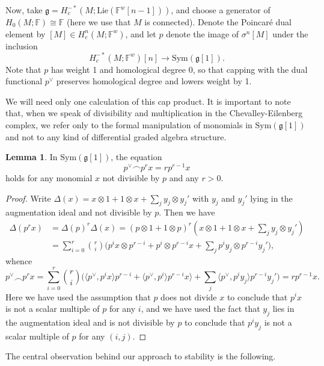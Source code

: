\documentclass{compositio}
\theoremstyle{definition}\newtheorem{definition}{Definition}[section]
\theoremstyle{theorem}\newtheorem{lemma}[definition]{Lemma}
\theoremstyle{remark}\newtheorem*{conventions}{Conventions}
\theoremstyle{remark}\newtheorem*{acknowledgments}{Acknowledgments}
\theoremstyle{remark}\newtheorem*{outline}{Outline}
\theoremstyle{remark}\newtheorem*{questions}{Questions}
\theoremstyle{remark}\newtheorem{example}[definition]{Example}
\theoremstyle{definition}\newtheorem{construction}[definition]{Construction}
\theoremstyle{definition}\newtheorem*{convention}{Convention}
\theoremstyle{definition}\newtheorem*{conjecture}{Conjecture}
\theoremstyle{theorem}\newtheorem{theorem}[definition]{Theorem}
\theoremstyle{theorem}\newtheorem{paradigm}[definition]{Paradigm}
\theoremstyle{remark}\newtheorem{remark}[definition]{Remark}
\theoremstyle{corollary}\newtheorem{corollary}[definition]{Corollary}
\theoremstyle{theorem}\newtheorem{proposition}[definition]{Proposition}
\theoremstyle{definition}\newtheorem{question}[definition]{Question}
\begin{document}
Now, take $\mathfrak{g}=H_c^{-*}(M;{\mathrm{Lie}}(\mathbb{F}^w[n-1]))$, and choose a generator of $H_0(M;\mathbb{F})\cong\mathbb{F}$ (here we use that $M$ is connected). Denote the Poincar\'{e} dual element by $[M]\in H_c^{n}(M;\mathbb{F}^w)$, and let $p$ denote the image of $\sigma^n[M]$ under the inclusion $$H_c^{-*}(M;\mathbb{F}^w)[n]\to {\mathrm{Sym}}(\mathfrak{g}[1]).$$ Note that $p$ has weight 1 and homological degree 0, so that capping with the dual functional $p^\vee$ preserves homological degree and lowers weight by 1. 

We will need only one calculation of this cap product. It is important to note that, when we speak of divisibility and multiplication in the Chevalley-Eilenberg complex, we refer only to the formal manipulation of monomials in ${\mathrm{Sym}}(\mathfrak{g}[1])$ and not to any kind of differential graded algebra structure. 

\begin{lemma}\label{cap formula}
In ${\mathrm{Sym}}(\mathfrak{g}[1])$, the equation $$p^\vee\frown p^rx=rp^{r-1}x$$ holds for any monomial $x$ not divisible by $p$ and any $r>0$.
\end{lemma}
\begin{proof}Write $\Delta(x)=x\otimes 1+1\otimes x+\sum_j y_j\otimes y_j'$ with $y_j$ and $y_j'$ lying in the augmentation ideal and not divisible by $p$. Then we have \begin{align*}\Delta(p^rx)&=\Delta(p)^r\Delta(x)=(p\otimes 1+1\otimes p)^r(x\otimes 1+1\otimes x+\sum_j y_j\otimes y_j')\\
&=\sum_{i=0}^r\binom{r}{i}\bigg(p^ix\otimes p^{r-i}+p^i\otimes p^{r-i}x+\sum_jp^iy_j\otimes p^{r-i}y_j'\bigg),
\end{align*} whence $$p^\vee\frown p^rx=\sum_{i=0}^r\binom{r}{i}\bigg(\langle p^\vee,p^ix\rangle p^{r-i}+\langle p^\vee, p^{i}\rangle p^{r-i}x\rangle+\sum_j\langle p^\vee, p^iy_j\rangle p^{r-i}y_j'\bigg)=rp^{r-1}x.$$ Here we have used the assumption that $p$ does not divide $x$ to conclude that $p^ix$ is not a scalar multiple of $p$ for any $i$, and we have used the fact that $y_j$ lies in the augmentation ideal and is not divisible by $p$ to conclude that $p^i y_j$ is not a scalar multiple of $p$ for any $(i,j)$.
\end{proof}

The central observation behind our approach to stability is the following.
\end{document}
